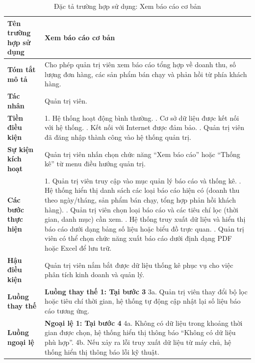 \begin{longtable}{|>{\bfseries}p{4cm}|p{11.5cm}|}
\caption{Đặc tả trường hợp sử dụng: Xem báo cáo cơ bản}
\label{tab:uc-admin-basic-reports} \\
\hline
\textbf{Tên trường hợp sử dụng} & Xem báo cáo cơ bản \\
\hline
\textbf{Tóm tắt mô tả} & Cho phép quản trị viên xem báo cáo tổng hợp về doanh thu, số lượng đơn hàng, các sản phẩm bán chạy và phản hồi từ phía khách hàng. \\
\hline
\textbf{Tác nhân} & Quản trị viên. \\
\hline
\textbf{Tiền điều kiện} & 1. Hệ thống hoạt động bình thường. \newline
2. Cơ sở dữ liệu được kết nối với hệ thống. \newline
3. Kết nối với Internet được đảm bảo. \newline
4. Quản trị viên đã đăng nhập thành công vào hệ thống quản trị. \\
\hline
\textbf{Sự kiện kích hoạt} & Quản trị viên nhấn chọn chức năng “Xem báo cáo” hoặc “Thống kê” từ menu điều hướng quản trị. \\
\hline
\textbf{Các bước thực hiện} & 1. Quản trị viên truy cập vào mục quản lý báo cáo và thống kê. \newline
2. Hệ thống hiển thị danh sách các loại báo cáo hiện có (doanh thu theo ngày/tháng, sản phẩm bán chạy, tổng hợp phản hồi khách hàng). \newline
3. Quản trị viên chọn loại báo cáo và các tiêu chí lọc (thời gian, danh mục) cần xem. \newline
4. Hệ thống truy xuất dữ liệu và hiển thị báo cáo dưới dạng bảng số liệu hoặc biểu đồ trực quan. \newline
5. Quản trị viên có thể chọn chức năng xuất báo cáo dưới định dạng PDF hoặc Excel để lưu trữ. \\
\hline
\textbf{Hậu điều kiện} & Quản trị viên nắm bắt được dữ liệu thống kê phục vụ cho việc phân tích kinh doanh và quản lý. \\
\hline
\textbf{Luồng thay thế} & \textbf{Luồng thay thế 1: Tại bước 3} \newline
3a. Quản trị viên thay đổi bộ lọc hoặc tiêu chí thời gian, hệ thống tự động cập nhật lại số liệu báo cáo tương ứng. \\
\hline
\textbf{Luồng ngoại lệ} & \textbf{Ngoại lệ 1: Tại bước 4} \newline
4a. Không có dữ liệu trong khoảng thời gian được chọn, hệ thống hiển thị thông báo “Không có dữ liệu phù hợp”. \newline
4b. Nếu xảy ra lỗi truy xuất dữ liệu từ máy chủ, hệ thống hiển thị thông báo lỗi kỹ thuật. \\
\hline
\end{longtable}

